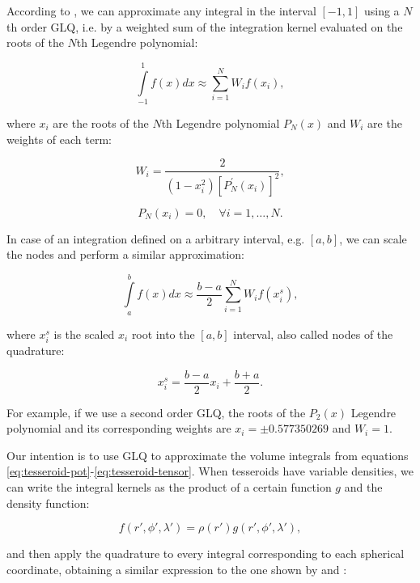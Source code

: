 \documentclass[extra]{gji}
\begin{document}
According to \citet[p.~390]{Hildebrand1987}, we can approximate any integral in the interval $[-1, 1]$ using a $N$th order GLQ, i.e. by a weighted sum of the integration kernel evaluated on the roots of the $N$th Legendre polynomial:

\begin{equation}
    \int\limits_{-1}^1 f(x) dx \approx \sum_{i=1}^N W_i f(x_i),
\end{equation}

\noindent where $x_i$ are the roots of the $N$th Legendre polynomial $P_N(x)$ and $W_i$ are the weights of each term:

\begin{equation}
    W_i = \frac{2}{(1-x_i^2)[P_N^\prime(x_i)]^2},
\end{equation}

\begin{equation}
    P_N(x_i) = 0, \quad \forall i = {1,\dots,N}.
\end{equation}

In case of an integration defined on a arbitrary interval, e.g. $[a,b]$, we can scale the nodes and perform a similar approximation:

\begin{equation}
    \int\limits_a^b f(x) dx \approx \frac{b-a}{2} \sum_{i=1}^N W_i f(x_i^s),
\label{eq:glq-scaled}
\end{equation}

\noindent where $x_i^s$ is the scaled $x_i$ root into the $[a,b]$ interval, also called nodes of the quadrature:

\begin{equation}
    x_i^s = \frac{b-a}{2} x_i + \frac{b+a}{2}.
\end{equation}

\noindent For example, if we use a second order GLQ, the roots of the $P_2(x)$ Legendre polynomial and its corresponding weights are $x_i = \pm 0.577350269$ and $W_i = 1$.

Our intention is to use GLQ to approximate the volume integrals from equations \ref{eq:tesseroid-pot}-\ref{eq:tesseroid-tensor}. 
When tesseroids have variable densities, we can write the integral kernels as the product of a certain function $g$ and the density function:

\begin{equation}
    f(r', \phi', \lambda') = \rho(r') g(r', \phi', \lambda'),
\end{equation}

\noindent and then apply the quadrature to every integral corresponding to each spherical coordinate, obtaining a similar expression to the one shown by \citet{Asgharzadeh2007} and \citet{Uieda2016}:
\end{document}
